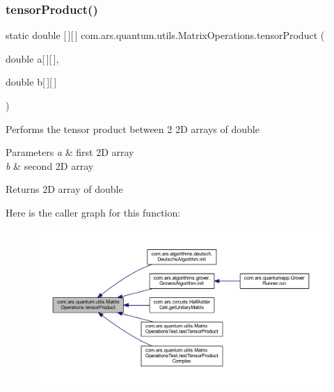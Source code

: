 \subsubsection{\texorpdfstring{tensor\+Product()}{tensorProduct()}\hspace{0.1cm}{\footnotesize\ttfamily [1/2]}}
{\footnotesize\ttfamily static double \mbox{[}$\,$\mbox{]}\mbox{[}$\,$\mbox{]} com.\+ars.\+quantum.\+utils.\+Matrix\+Operations.\+tensor\+Product (\begin{DoxyParamCaption}\item[{double}]{a\mbox{[}$\,$\mbox{]}\mbox{[}$\,$\mbox{]},  }\item[{double}]{b\mbox{[}$\,$\mbox{]}\mbox{[}$\,$\mbox{]} }\end{DoxyParamCaption})\hspace{0.3cm}{\ttfamily [static]}}

Performs the tensor product between 2 2D arrays of double


\begin{DoxyParams}{Parameters}
{\em a} & first 2D array \\
\hline
{\em b} & second 2D array \\
\hline
\end{DoxyParams}
\begin{DoxyReturn}{Returns}
2D array of double 
\end{DoxyReturn}
Here is the caller graph for this function\+:
\nopagebreak
\begin{figure}[H]
\begin{center}
\leavevmode
\includegraphics[width=350pt]{classcom_1_1ars_1_1quantum_1_1utils_1_1_matrix_operations_ae32f245d0796d98e4a10e3f213ae621a_icgraph}
\end{center}
\end{figure}
\hypertarget{classcom_1_1ars_1_1quantum_1_1utils_1_1_matrix_operations_ab603ff7c94e923390ba21bbedbde64bf}{}\label{classcom_1_1ars_1_1quantum_1_1utils_1_1_matrix_operations_ab603ff7c94e923390ba21bbedbde64bf} 
